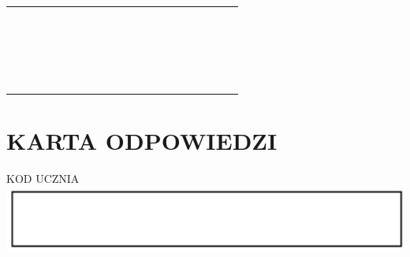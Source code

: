 \documentclass[10pt]{article}
\begin{document}
\begin{center}
\begin{tabular}{|c|c|c|c|c|c|c|c|c|c|c|c|c|c|c|c|c|c|c|c|c|}
\hline
 &  &  &  &  &  &  &  &  &  &  &  &  &  &  &  &  &  &  &  &  \\
\hline
 &  &  &  &  &  &  &  &  &  &  &  &  &  &  &  &  &  &  &  &  \\
\hline
 &  &  &  &  &  &  &  &  &  &  &  &  &  &  &  &  &  &  &  &  \\
\hline
 &  &  &  &  &  &  &  &  &  &  &  &  &  &  &  &  &  &  &  &  \\
\hline
 &  &  &  &  &  &  &  &  &  &  &  &  &  &  &  &  &  &  &  &  \\
\hline
 &  &  &  &  &  &  &  &  &  &  &  &  &  &  &  &  &  &  &  &  \\
\hline
 &  &  &  &  &  &  &  &  &  &  &  &  &  &  &  &  &  &  &  &  \\
\hline
 &  &  &  &  &  &  &  &  &  &  &  &  &  &  &  &  &  &  &  &  \\
\hline
 &  &  &  &  &  &  &  &  &  &  &  &  &  &  &  &  &  &  &  &  \\
\hline
 &  &  &  &  &  &  &  &  &  &  &  &  &  &  &  &  &  &  &  &  \\
\hline
 &  &  &  &  &  &  &  &  &  &  &  &  &  &  &  &  &  &  &  &  \\
\hline
 &  &  &  &  &  &  &  &  &  &  &  &  &  &  &  &  &  &  &  &  \\
\hline
 &  &  &  &  &  &  &  &  &  &  &  &  &  &  &  &  &  &  &  &  \\
\hline
 &  &  &  &  &  &  &  &  &  &  &  &  &  &  &  &  &  &  &  &  \\
\hline
 &  &  &  &  &  &  &  &  &  &  &  &  &  &  &  &  &  &  &  &  \\
\hline
 &  &  &  &  &  &  &  &  &  &  &  &  &  &  &  &  &  &  &  &  \\
\hline
 &  &  &  &  &  &  &  &  &  &  &  &  &  &  &  &  &  &  &  &  \\
\hline
 &  &  &  &  &  &  &  &  &  &  &  &  &  &  &  &  &  &  &  &  \\
\hline
 &  &  &  &  &  &  &  &  &  &  &  &  &  &  &  &  &  &  &  &  \\
\hline
 &  &  &  &  &  &  &  &  &  &  &  &  &  &  &  &  &  &  &  &  \\
\hline
 &  &  &  &  &  &  &  &  &  &  &  &  &  &  &  &  &  &  &  &  \\
\hline
 &  &  &  &  &  &  &  &  &  &  &  &  &  &  &  &  &  &  &  &  \\
\hline
\end{tabular}
\end{center}

\section*{KARTA ODPOWIEDZI}
KOD UCZNIA\\
\includegraphics[max width=\textwidth, center]{2024_11_21_cce9c7ad32a1dbcd58dag-16}
\end{document}
